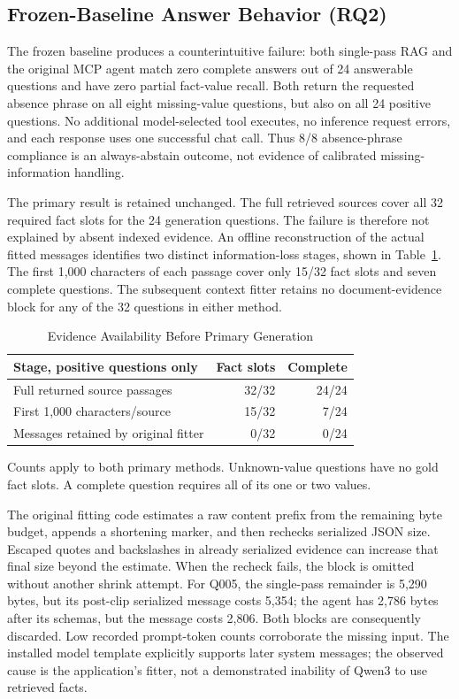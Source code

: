 \documentclass[conference,letterpaper]{IEEEtran}
\begin{document}
\subsection{Frozen-Baseline Answer Behavior (RQ2)}
The frozen baseline produces a counterintuitive failure: both single-pass RAG and the original MCP agent match zero complete answers out of 24 answerable questions and have zero partial fact-value recall. Both return the requested absence phrase on all eight missing-value questions, but also on all 24 positive questions. No additional model-selected tool executes, no inference request errors, and each response uses one successful chat call. Thus 8/8 absence-phrase compliance is an always-abstain outcome, not evidence of calibrated missing-information handling.

The primary result is retained unchanged. The full retrieved sources cover all 32 required fact slots for the 24 generation questions. The failure is therefore not explained by absent indexed evidence. An offline reconstruction of the actual fitted messages identifies two distinct information-loss stages, shown in Table~\ref{tab:context}. The first 1,000 characters of each passage cover only 15/32 fact slots and seven complete questions. The subsequent context fitter retains no document-evidence block for any of the 32 questions in either method.

\begin{table}[t]
\caption{Evidence Availability Before Primary Generation}
\label{tab:context}
\centering\small
\begin{tabularx}{\columnwidth}{@{}Xrr@{}}
\toprule
Stage, positive questions only & Fact slots & Complete \\
\midrule
Full returned source passages & 32/32 & 24/24 \\
First 1,000 characters/source & 15/32 & 7/24 \\
Messages retained by original fitter & 0/32 & 0/24 \\
\bottomrule
\end{tabularx}
\vspace{3pt}
\parbox{\columnwidth}{\footnotesize Counts apply to both primary methods. Unknown-value questions have no gold fact slots. A complete question requires all of its one or two values.}
\end{table}

The original fitting code estimates a raw content prefix from the remaining byte budget, appends a shortening marker, and then rechecks serialized JSON size. Escaped quotes and backslashes in already serialized evidence can increase that final size beyond the estimate. When the recheck fails, the block is omitted without another shrink attempt. For Q005, the single-pass remainder is 5,290 bytes, but its post-clip serialized message costs 5,354; the agent has 2,786 bytes after its schemas, but the message costs 2,806. Both blocks are consequently discarded. Low recorded prompt-token counts corroborate the missing input. The installed model template explicitly supports later system messages; the observed cause is the application's fitter, not a demonstrated inability of Qwen3 to use retrieved facts.
\end{document}

